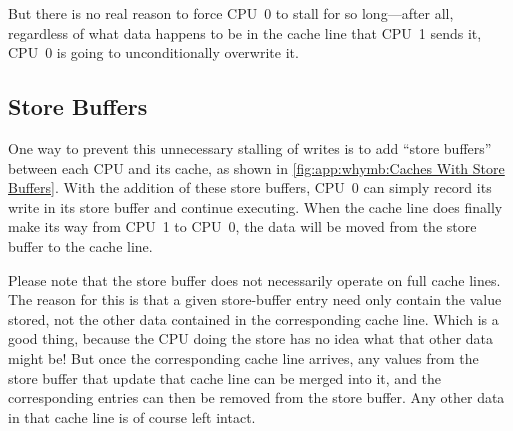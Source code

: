 But there is no real reason to force CPU~0 to stall for so long---after
all, regardless of what data happens to be in the cache line that CPU~1
sends it, CPU~0 is going to unconditionally overwrite it.

\subsection{Store Buffers}
\label{sec:app:whymb:Store Buffers}

One way to prevent this unnecessary stalling of writes is to add
``store buffers'' between each CPU and its cache, as shown in
\cref{fig:app:whymb:Caches With Store Buffers}.
With the addition of these store buffers, CPU~0 can simply record
its write in its store buffer and continue executing.
When the cache line does finally make its way from CPU~1 to CPU~0,
the data will be moved from the store buffer to the cache line.

\QuickQuizEnd

Please note that the store buffer does not necessarily operate on
full cache lines.
The reason for this is that a given store-buffer entry need only contain
the value stored, not the other data contained in the corresponding
cache line.
Which is a good thing, because the CPU doing the store has no idea
what that other data might be!
But once the corresponding cache line arrives, any values from the
store buffer that update that cache line can be merged into it,
and the corresponding entries can then be removed from the store buffer.
Any other data in that cache line is of course left intact.

